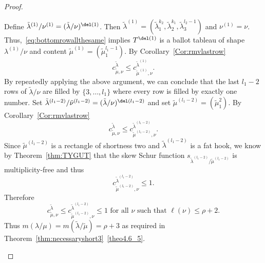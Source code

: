 \begin{proof}
\begin{Case}
Define $\tilde \lambda^{(1)}/ \nu^{(1)} = (\tilde \lambda / \nu)^{\del (1)}$. Then $\tilde\lambda^{(1)} = (\tilde\lambda_1^{k_2},\tilde\lambda_2^{k_1},\tilde\lambda_3^{l_2-1})$ and $\nu^{(1)} = \nu$. Thus,~\eqref{eq:bottomrowallthesame} implies $T^{\del (1)}$ is a ballot tableau of shape $\lambda^{(1)}/\nu$ and content $\tilde \mu^{(1)} = (\tilde\mu_1^{l_1-1})$. By Corollary~\ref{Cor:rmvlastrow}
\[
c^{\tilde\lambda}_{\tilde\mu,\nu} \leq c^{\tilde\lambda^{(1)}}_{\tilde\mu^{(1)},\nu}.
\]
By repeatedly applying the above argument, we can conclude that the last $l_1-2$ rows of $\tilde\lambda/\nu$ are filled by $\{3,\ldots,l_1\}$ where every row is filled by exactly one number. Set $\tilde \lambda^{(l_1-2)} / \tilde \nu^{(l_1-2)} = (\tilde \lambda / \nu)^{\del (l_1-2)}$ and set $\tilde\mu^{(l_1-2)} = (\tilde \mu_1^2)$. By Corollary~\ref{Cor:rmvlastrow}
\[
c^{\tilde\lambda}_{\tilde\mu,\nu}\leq c^{\tilde \lambda^{(l_1-2)}}_{\tilde \mu^{(l_1-2)},\nu}.
\]
Since $\tilde\mu^{(l_1-2)}$ is a rectangle of shortness two and $\tilde \lambda^{(l_1-2)}$ is a fat hook, we know by Theorem~\ref{thm:TYGUT} that the skew Schur function $s_{\tilde\lambda^{(l_1-2)}/\tilde\mu^{(l_1-2)}}$ is multiplicity-free and thus
\[
c^{\tilde \lambda^{(l_1-2)}}_{\tilde \mu^{(l_1-2)},\nu} \leq 1.
\]
Therefore 
\[
c^{\tilde\lambda}_{\tilde\mu,\nu} \leq c^{\tilde \lambda^{(l_1-2)}}_{\tilde \mu^{(l_1-2)},\nu} \leq 1 \text{ for all }\nu\text{ such that }\ell(\nu)\leq \rho+2.
\]
Thus $m(\lambda/\mu) = m(\tilde\lambda/\tilde\mu) = \rho+3$ as required in Theorem~\ref{thm:necessaryshort3}~\ref{theo4.6_5}.


\begin{figure}[b]\centering
\end{figure}
\end{Case}
\end{proof}
